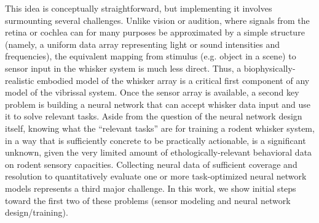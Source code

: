 This idea is conceptually straightforward, but implementing it involves surmounting several challenges.
Unlike vision or audition, where signals from the retina or cochlea can for many purposes be approximated by a simple structure (namely, a uniform data array representing light or sound intensities and frequencies), the equivalent mapping from stimulus (e.g. object in a scene) to sensor input in the whisker system is much less direct.
Thus, a biophysically-realistic embodied model of the whisker array is a critical first component of any model of the vibrissal system.
Once the sensor array is available, a second key problem is building a neural network that can accept whisker data input and use it to solve relevant tasks.
Aside from the question of the neural network design itself, knowing what the ``relevant tasks'' are for training a rodent whisker system, in a way that is sufficiently concrete to be practically actionable, is a significant unknown, given the very limited amount of ethologically-relevant behavioral data on rodent sensory capacities\cite{von2007neuronal, Knutsen2006, OConnor2010, Arabzadeh2005, Diamond2008}.
Collecting neural data of sufficient coverage and resolution to quantitatively evaluate one or more task-optimized neural network models represents a third major challenge.
In this work, we show initial steps toward the first two of these problems (sensor modeling and neural network design/training).



